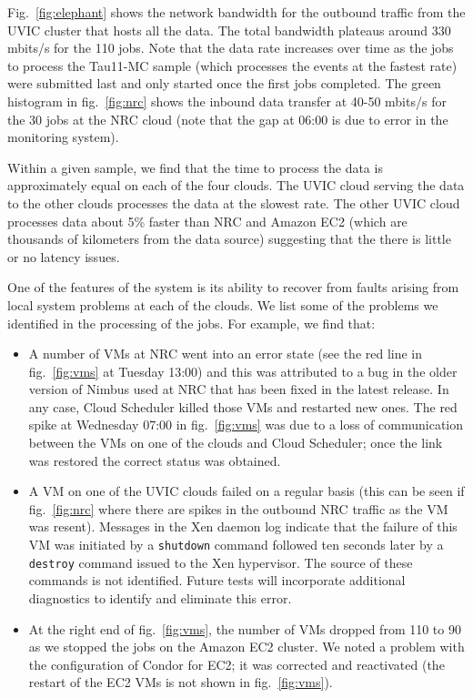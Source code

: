 \documentclass[10pt, conference, compsocconf]{IEEEtran}
\begin{document}
Fig.~\ref{fig:elephant} shows the network bandwidth for the outbound traffic
from the UVIC cluster that hosts all the data.  
The total bandwidth plateaus around 330 mbits/s for the 110 jobs.
Note that the data rate increases over time as the jobs to process the Tau11-MC
sample (which processes the events at the fastest rate) were submitted last and
only started once the first jobs completed. 
The green histogram in fig.~\ref{fig:nrc} shows the inbound data transfer
at 40-50 mbits/s for the 30 jobs at the NRC cloud (note that the gap at 06:00 is
due to error in the monitoring system).

Within a given sample, we find that the time to process the data is 
approximately equal on each of the four clouds.
The UVIC cloud serving the data to the other clouds processes the data at 
the slowest rate.
The other UVIC cloud processes data about 5\% faster than NRC and Amazon EC2
(which are thousands of kilometers from the data source) suggesting that  
the there is little or no latency issues.

One of the features of the system is its ability to recover from faults 
arising from local system problems at each of the clouds.   
We list some of the problems we identified in the processing of the jobs.
For example, we find that:

\begin{itemize}
\item
A number of VMs at NRC went into an error state 
(see the red line in fig.~\ref{fig:vms} at Tuesday 13:00) and
this was attributed to a bug in the older version of Nimbus used at NRC that
has been fixed in the latest release.
In any case, Cloud Scheduler killed those VMs and restarted new ones.
The red spike at Wednesday 07:00 in fig.~\ref{fig:vms}  was due to a loss of 
communication between the VMs on one of the clouds and Cloud Scheduler;
once the link was restored the correct status was obtained.

\item
A VM on one of the UVIC clouds failed on a regular basis (this can 
be seen if fig.~\ref{fig:nrc} where there are spikes in the outbound
NRC traffic as the VM  was resent).
Messages in the Xen daemon log indicate that the failure of this VM
was initiated by a \texttt{shutdown} command followed ten seconds later by a 
\texttt{destroy} command issued to the Xen hypervisor.
The source of these commands is not identified.
Future tests will incorporate additional diagnostics to identify and eliminate this error.


\item
At the right end of fig.~\ref{fig:vms}, the number of VMs dropped
from 110 to 90 as we stopped the jobs on the Amazon EC2 cluster.
We noted a problem with the configuration of Condor for EC2;  it was 
corrected and reactivated (the restart of the EC2 VMs is not shown
in fig.~\ref{fig:vms}).
\end{itemize}
\end{document}
